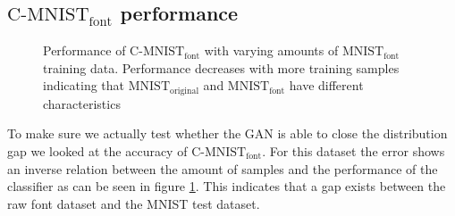 \documentclass[10pt,twocolumn,letterpaper]{article}
\begin{document}

\subsection{$\text{C-MNIST}_\text{font}$ performance}
\begin{figure}
\begin{center}
\end{center}
   \caption{Performance of $\text{C-MNIST}_\text{font}$ with varying amounts of $\text{MNIST}_\text{font}$ training data. Performance decreases with more training samples indicating that $\text{MNIST}_\text{original}$ and $\text{MNIST}_\text{font}$ have different characteristics}
\label{fig:graph-font}
\end{figure}

To make sure we actually test whether the GAN is able to close the distribution gap we looked at the accuracy of $\text{C-MNIST}_\text{font}$. For this dataset the error shows an inverse relation between the amount of samples and the performance of the classifier as can be seen in figure \ref{fig:graph-font}. This indicates that a gap exists between the raw font dataset and the MNIST test dataset.

\end{document}
